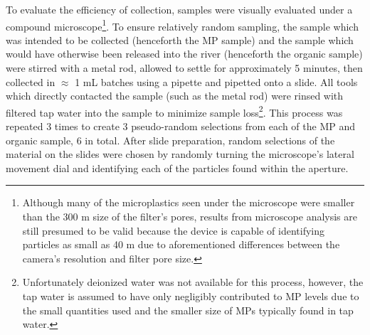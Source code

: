 \documentclass[fleqn,10pt]{SelfArx} %
\begin{document}
	To evaluate the efficiency of collection, samples were visually evaluated under a compound microscope\footnote{Although many of the microplastics seen under the microscope were smaller than the 300 \textmu m size of the filter's pores, results from microscope analysis are still presumed to be valid because the device is capable of identifying particles as small as 40 \textmu m due to aforementioned differences between the camera's resolution and filter pore size.}. To ensure relatively random sampling, the sample which was intended to be collected (henceforth the MP sample) and the sample which would have otherwise been released into the river (henceforth the organic sample) were stirred with a metal rod, allowed to settle for approximately 5 minutes, then collected in $\approx$ 1 mL batches using a pipette and pipetted onto a slide. All tools which directly contacted the sample (such as the metal rod) were rinsed with filtered tap water into the sample to minimize sample loss\footnote{Unfortunately deionized water was not available for this process, however, the tap water is assumed to have only negligibly contributed to MP levels due to the small quantities used and the smaller size of MPs typically found in tap water.}. This process was repeated 3 times to create 3 pseudo-random selections from each of the MP and organic sample, 6 in total. After slide preparation, random selections of the material on the slides were chosen by randomly turning the microscope's lateral movement dial and identifying each of the particles found within the aperture. 
\end{document}
